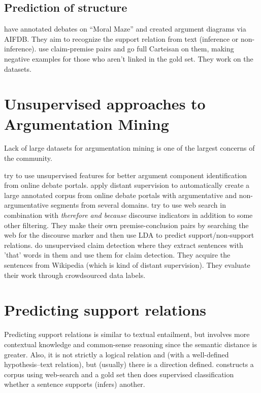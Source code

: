\documentclass[a4paper,10pt]{article}
\begin{document}
\subsection{Prediction of structure}

\cite{Lawrence2017} have annotated debates on ``Moral Maze'' and created
argument diagrams via AIFDB. They aim to recognize the support relation
from text (inference or non-inference).
\cite{Aker2017} use claim-premise pairs and go full Carteisan on them,
making negative examples for those who aren't linked in the gold set. They
work on the \cite{stab2017parsing, aharoni2014benchmark} datasets.

\section{Unsupervised approaches to Argumentation Mining}

Lack of large datasets for argumentation mining is one of the largest
concerns of the community. 

\cite{habernal2015exploiting} try to use unsupervised features for
better argument component identification from online debate portals. 
\cite{al2016cross} apply distant supervision to automatically create
a large annotated corpus from online debate portals with argumentative and
non-argumentative segments from several domains. 
\cite{Lawrence2017} try to use web search in combination with
\emph{therefore and because} discourse indicators in addition to some
other filtering. They make their own premise-conclusion pairs by searching
the web for the discourse marker and then use LDA to predict
support/non-support relations.
\cite{Levy2017} do unsupervised claim detection where they extract
sentences with 'that' words in them and use 
them for claim detection. They acquire the sentences 
from Wikipedia (which is kind of distant supervision).
They evaluate their work through crowdsourced data labels. 

\section{Predicting support relations}

Predicting support relations is similar to textual entailment, but
involves more contextual knowledge and common-sense reasoning since the
semantic distance is greater. Also, it is not strictly a logical relation
and (with a well-defined hypothesis--text relation), but (usually) there
is a direction defined.
\cite{Lawrence2017} constructs a corpus using web-search and a gold set
then does supervised classification whether a sentence supports (infers)
another. 
\end{document}
